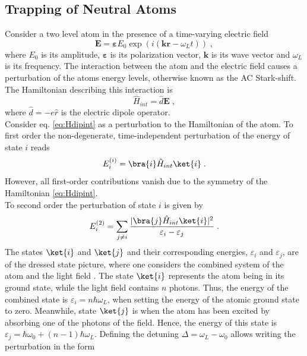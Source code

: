 \subsection{Trapping of Neutral Atoms}
Consider a two level atom in the presence of a time-varying electric field
\begin{equation}
	\boldsymbol{E} = \boldsymbol{\varepsilon} E_0 \exp \left( i(\boldsymbol{k} \boldsymbol{r} - \omega_L t) \right) \; ,
\end{equation}
where $E_0$ is its amplitude, $\boldsymbol{\varepsilon}$ is its polarization vector, $\boldsymbol{k}$ is its wave vector and $\omega_L$ is its frequency. The interaction between the atom and the electric field causes a perturbation of the atoms energy levels, otherwise known as the AC Stark-shift. The Hamiltonian describing this interaction is
\begin{equation}
	\hat{H}_{int} = \hat{d} \boldsymbol{E} \; , \label{eq:Hdipint}
\end{equation}
where $\hat{d} = -e \hat{r}$ is the electric dipole operator.\\
Consider eq. \eqref{eq:Hdipint} as a perturbation to the Hamiltonian of the atom. To first order the non-degenerate, time-independent perturbation of the energy of state $i$ reads
\begin{equation}
	E_{i}^{(i)} = \bra{i} \hat{H}_{int} \ket{i} \; .
\end{equation}
However, all first-order contributions vanish due to the symmetry of the Hamiltonian \eqref{eq:Hdipint}.\\
To second order the perturbation of state $i$ is given by
\begin{equation}
	E_i^{(2)} = \sum_{j \neq i} \frac{ |\bra{j} \hat{H}_{int}\ket{i}|^2}{\varepsilon_i - \varepsilon_j} \; .
\end{equation}
The states $\ket{i}$ and $\ket{j}$ and their corresponding energies, $\varepsilon_i$ and $\varepsilon_j$, are of the dressed state picture, where one considers the combined system of the atom and the light field \cite{cohen1992atom}. The state $\ket{i}$ represents the atom being in its ground state, while the light field contains $n$ photons. Thus, the energy of the combined state is $\varepsilon_i = n \hbar \omega_L$, when setting the energy of the atomic ground state to zero. Meanwhile, state $\ket{j}$ is when the atom has been excited by absorbing one of the photons of the field. Hence, the energy of this state is $\varepsilon_j = \hbar \omega_0 + (n-1) \hbar \omega_L$. Defining the detuning $\Delta = \omega_L - \omega_0$ allows writing the perturbation in the form
